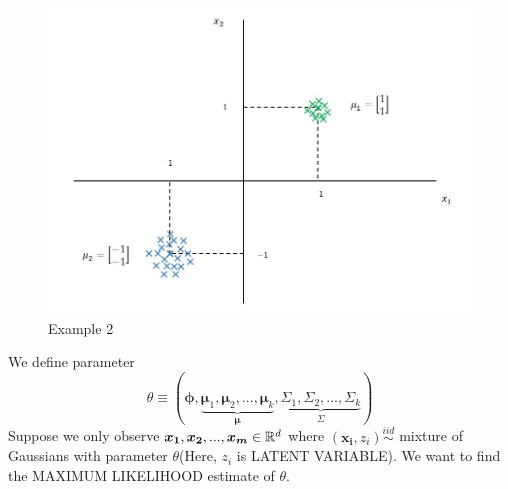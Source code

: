 \documentclass[a4paper,english,12pt]{article}
\begin{document}
\begin{figure}[h]
\centering
\includegraphics[width=0.9\linewidth]{Figures/Lect26fig2.jpg}
\caption[rdr]{Example 2}
\label{fig:Example 2}
\end{figure}
\vspace{0.75cm}
We define parameter $$\theta\equiv(\pmb{\phi}, \underbrace{\boldsymbol{\mu}_1, \boldsymbol{\mu}_2, ...,\boldsymbol{\mu}_k}_{\boldsymbol{\mu}}, \underbrace{\Sigma_1, \Sigma_2, ...,\Sigma_k}_{\Sigma})$$
Suppose we only observe $\boldsymbol{x_1},\boldsymbol{x_2},...,\boldsymbol{x_m}\in \mathbb{R}^d$ where $(\boldsymbol{x_i},z_i)\overset{iid}{\sim }$ mixture of Gaussians with parameter $\theta$(Here, $z_i$ is LATENT VARIABLE). We want to find the MAXIMUM LIKELIHOOD estimate of $\theta$.
\end{document}
